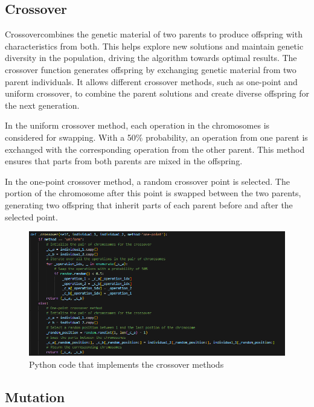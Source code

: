 \documentclass[11pt, a4paper]{article}
\begin{document}
\subsection{Crossover}

Crossovercombines the genetic material of two parents to produce offspring with characteristics from both. This helps explore new solutions and maintain genetic diversity 
in the population, driving the algorithm towards optimal results. The crossover function generates offspring by exchanging genetic material from two parent individuals. 
It allows different crossover methods, such as one-point and uniform crossover, to combine the parent solutions and create diverse offspring for the next generation.

\vspace{1em} In the uniform crossover method, each operation in the chromosomes is considered for swapping. With a 50\% probability, an operation from one parent is exchanged 
with the corresponding operation from the other parent. This method ensures that parts from both parents are mixed in the offspring.

\vspace{1em} In the one-point crossover method, a random crossover point is selected. The portion of the chromosome after this point is swapped between the two parents, 
generating two offspring that inherit parts of each parent before and after the selected point.

\begin{figure}[H]
    \centering
    \includegraphics[width=\textwidth]{media/crossover.png}
    \caption{Python code that implements the crossover methods}
    \label{fig:image_9}
\end{figure}

\subsection{Mutation}
\end{document}
